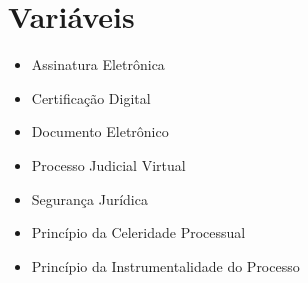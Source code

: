 \chapter{Variáveis}
\begin{itemize}
    \item Assinatura Eletrônica
    \item Certificação Digital
    \item Documento Eletrônico
    \item Processo Judicial Virtual
    \item Segurança Jurídica
    \item Princípio da Celeridade Processual
    \item Princípio da Instrumentalidade do Processo
\end{itemize}
